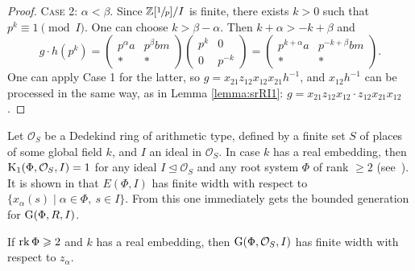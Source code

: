 \begin{proof}
\textsc{Case 2:} $\alpha<\beta$. Since $\mathbb{Z}[\sfrac{1}{p}]/I$ is finite, there exists $k>0$ such that $p^k\equiv 1\pmod I$. One can choose $k>\beta-\alpha$. Then $k+\alpha>-k+\beta$ and
\[ g\cdot h\left(p^k\right) =
\begin{pmatrix} p^\alpha a & p^\beta bm \\ * & * \end{pmatrix}
\begin{pmatrix} p^k & 0 \\ 0 & p^{-k} \end{pmatrix}=
\begin{pmatrix} p^{k+\alpha} a & p^{-k+\beta} bm \\ * & * \end{pmatrix}.
\]
One can apply Case 1 for the latter, so
$g=x_{21}z_{12}x_{12}x_{21}h^{-1}$,
and $x_{12}h^{-1}$ can be processed in the same way, as in Lemma \ref{lemma:srRI1}:
$g=x_{21}z_{12}x_{12}\cdot z_{12}x_{21}x_{12}$.
\end{proof}
Let $\mathcal{O}_S$ be a Dedekind ring of arithmetic type, defined by a finite set $S$ of places of some global field $k$, and $I$ an ideal in $\mathcal{O}_S$. In case $k$ has a real embedding, then $\operatorname{K}_1(\Phi,\mathcal{O}_S,I)=1$ for any ideal $I\trianglelefteq\mathcal{O}_S$ and any root system $\Phi$ of rank $\geqslant2$ (see~\cite{BassMilnorSerre}). It is shown in \cite{TavgenThesis} that $E(\Phi,I)$ has finite width with respect to $\{x_\alpha(s)\mid\alpha\in\Phi,\ s\in I\}$. From this one immediately gets the bounded generation for $\operatorname{G}(\Phi,R,I)$.
\begin{lemma}
If $\operatorname{rk}\Phi\geqslant2$ and $k$ has a real embedding, then $\operatorname{G}(\Phi,\mathcal{O}_S,I)$ has finite width with respect to $z_\alpha$.
\end{lemma}
